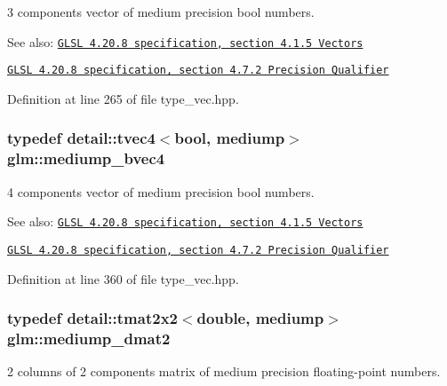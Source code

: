 3 components vector of medium precision bool numbers.

\begin{Desc}
\item[See also:]\href{http://www.opengl.org/registry/doc/GLSLangSpec.4.20.8.pdf}{\tt GLSL 4.20.8 specification, section 4.1.5 Vectors} 

\href{http://www.opengl.org/registry/doc/GLSLangSpec.4.20.8.pdf}{\tt GLSL 4.20.8 specification, section 4.7.2 Precision Qualifier} \end{Desc}


Definition at line 265 of file type\_\-vec.hpp.\hypertarget{group__core__precision_g8bb7cfe902e2cb356450d211ca4d58e2}{
\subsubsection[mediump\_\-bvec4]{\setlength{\rightskip}{0pt plus 5cm}typedef detail::tvec4$<$bool, mediump$>$ {\bf glm::mediump\_\-bvec4}}}
\label{group__core__precision_g8bb7cfe902e2cb356450d211ca4d58e2}


4 components vector of medium precision bool numbers.

\begin{Desc}
\item[See also:]\href{http://www.opengl.org/registry/doc/GLSLangSpec.4.20.8.pdf}{\tt GLSL 4.20.8 specification, section 4.1.5 Vectors} 

\href{http://www.opengl.org/registry/doc/GLSLangSpec.4.20.8.pdf}{\tt GLSL 4.20.8 specification, section 4.7.2 Precision Qualifier} \end{Desc}


Definition at line 360 of file type\_\-vec.hpp.\hypertarget{group__core__precision_gc056ec9d1c37e591172544088163b7e4}{
\subsubsection[mediump\_\-dmat2]{\setlength{\rightskip}{0pt plus 5cm}typedef detail::tmat2x2$<$double, mediump$>$ {\bf glm::mediump\_\-dmat2}}}
\label{group__core__precision_gc056ec9d1c37e591172544088163b7e4}


2 columns of 2 components matrix of medium precision floating-point numbers.

